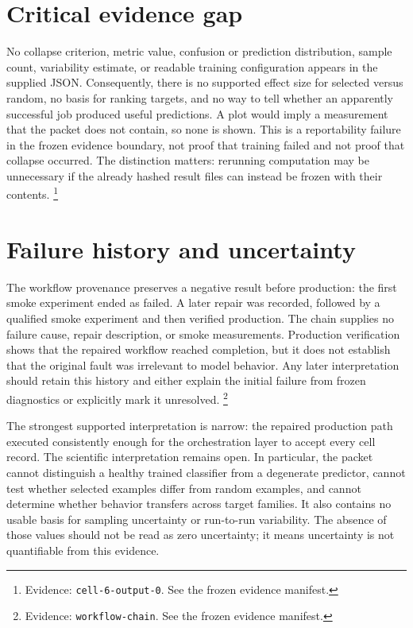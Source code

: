 \documentclass[10pt,twocolumn,letterpaper]{article}
\begin{document}
\section{Critical evidence gap}
No collapse criterion, metric value, confusion or prediction distribution, sample count, variability estimate, or readable training configuration appears in the supplied JSON. Consequently, there is no supported effect size for selected versus random, no basis for ranking targets, and no way to tell whether an apparently successful job produced useful predictions. A plot would imply a measurement that the packet does not contain, so none is shown. This is a reportability failure in the frozen evidence boundary, not proof that training failed and not proof that collapse occurred. The distinction matters: rerunning computation may be unnecessary if the already hashed result files can instead be frozen with their contents. \footnote{Evidence: \texttt{cell-6-output-0}. See the frozen evidence manifest.}

\clearpage
\section{Failure history and uncertainty}
The workflow provenance preserves a negative result before production: the first smoke experiment ended as failed. A later repair was recorded, followed by a qualified smoke experiment and then verified production. The chain supplies no failure cause, repair description, or smoke measurements. Production verification shows that the repaired workflow reached completion, but it does not establish that the original fault was irrelevant to model behavior. Any later interpretation should retain this history and either explain the initial failure from frozen diagnostics or explicitly mark it unresolved. \footnote{Evidence: \texttt{workflow-chain}. See the frozen evidence manifest.}

The strongest supported interpretation is narrow: the repaired production path executed consistently enough for the orchestration layer to accept every cell record. The scientific interpretation remains open. In particular, the packet cannot distinguish a healthy trained classifier from a degenerate predictor, cannot test whether selected examples differ from random examples, and cannot determine whether behavior transfers across target families. It also contains no usable basis for sampling uncertainty or run-to-run variability. The absence of those values should not be read as zero uncertainty; it means uncertainty is not quantifiable from this evidence.
\end{document}
